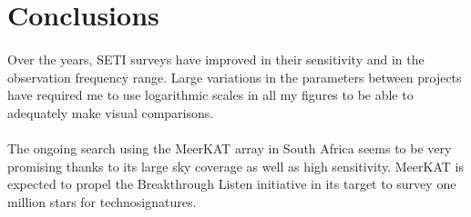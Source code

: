 \documentclass{article}
\begin{document}
\section{Conclusions}

\paragraph{}
Over the years, SETI surveys have improved in their sensitivity and in the observation frequency range. Large variations in the parameters between projects have required me to use logarithmic scales in all my figures to be able to adequately make visual comparisons.

\paragraph{}
The ongoing search using the MeerKAT array in South Africa seems to be very promising thanks to its large sky coverage as well as high sensitivity. MeerKAT is expected to propel the Breakthrough Listen initiative in its target to survey one million stars for technosignatures.
\end{document}
